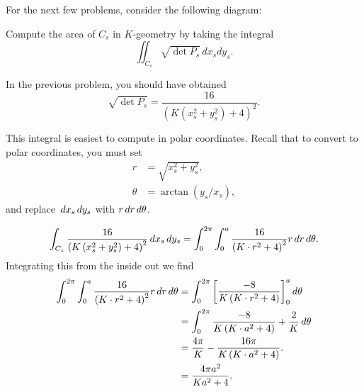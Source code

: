 \documentclass[newpage,hints,12pt,noauthor,nooutcomes]{ximera}
\begin{document}
For the next few problems, consider the following diagram:
\begin{center}
\end{center}


\begin{problem}
  Compute the area of $C_s$ in $K$-geometry by taking the integral
  \[\iint_{C_s} \sqrt{\det P_s}\, dx_sdy_s.\]
  \begin{hint}
    In the previous problem, you should have obtained
    \[\sqrt{\det P_s}=\frac{16}{(K(x_s^2+y_s^2)+4)^2}.\]
  \end{hint}
  \begin{hint}
    This integral is easiest to compute in polar coordinates.  Recall that to
    convert to polar coordinates, you must set
    \begin{align*}
      r &= \sqrt{x_s^2+y_s^2},\\
      \theta &= \arctan(y_s/x_s),
    \end{align*}
    and replace $\,d x_s\,d y_s$ with $r\,d r\,d \theta$.
  \end{hint}
  \begin{freeResponse}
    \[
    \int_{C_s} \frac{16}{\left(K\left(x_s^2+y_s^2\right)+4\right)^2} \,d x_s\,d y_s
    =\int_0^{2\pi}\int_0^a \frac{16}{\left(K\cdot r^2+4\right)^2} r\,d r \,d \theta.
    \]
    Integrating this from the inside out we find
    \begin{align*}
      \int_0^{2\pi} \int_0^a \frac{16}{\left(K\cdot r^2+4\right)^2} r\,d r \,d \theta
      &= \int_0^{2\pi} \bigg[ \frac{-8}{K\left(K\cdot r^2+4\right)} \bigg]_0^a \,d \theta\\
      &= \int_0^{2\pi} \frac{-8}{K\left(K\cdot a^2+4\right)}+\frac{2}{K} \,d \theta\\
      &= \frac{4\pi}{K}-\frac{16\pi}{K\left(K\cdot a^2+4\right)}. \\
      &= \frac{4\pi a^2}{Ka^2+4}.
    \end{align*}
  \end{freeResponse}
\end{problem}
\end{document}
